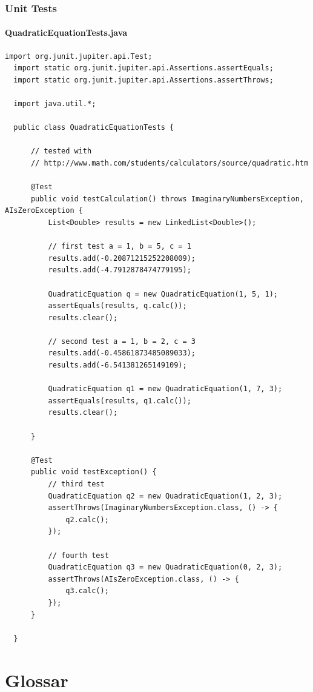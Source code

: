 \documentclass[a4paper,12pt,twoside]{scrreprt}
\begin{document}
\subsection{Unit Tests}
\subsubsection{QuadraticEquationTests.java}
\begin{lstlisting}[basicstyle=\small]
  import org.junit.jupiter.api.Test;
  import static org.junit.jupiter.api.Assertions.assertEquals;
  import static org.junit.jupiter.api.Assertions.assertThrows;
  
  import java.util.*;
  
  public class QuadraticEquationTests {
  
      // tested with
      // http://www.math.com/students/calculators/source/quadratic.htm
  
      @Test
      public void testCalculation() throws ImaginaryNumbersException, AIsZeroException {
          List<Double> results = new LinkedList<Double>();
  
          // first test a = 1, b = 5, c = 1
          results.add(-0.20871215252208009);
          results.add(-4.7912878474779195);
  
          QuadraticEquation q = new QuadraticEquation(1, 5, 1);
          assertEquals(results, q.calc());
          results.clear();
  
          // second test a = 1, b = 2, c = 3
          results.add(-0.45861873485089033);
          results.add(-6.541381265149109);
  
          QuadraticEquation q1 = new QuadraticEquation(1, 7, 3);
          assertEquals(results, q1.calc());
          results.clear();
  
      }
  
      @Test
      public void testException() {
          // third test
          QuadraticEquation q2 = new QuadraticEquation(1, 2, 3);
          assertThrows(ImaginaryNumbersException.class, () -> {
              q2.calc();
          });
  
          // fourth test
          QuadraticEquation q3 = new QuadraticEquation(0, 2, 3);
          assertThrows(AIsZeroException.class, () -> {
              q3.calc();
          });
      }
  
  }
\end{lstlisting}



\clearpage
{}
{}  %
\chapter*{Glossar} %
\begin{acronym}
\end{acronym}
\end{document}
